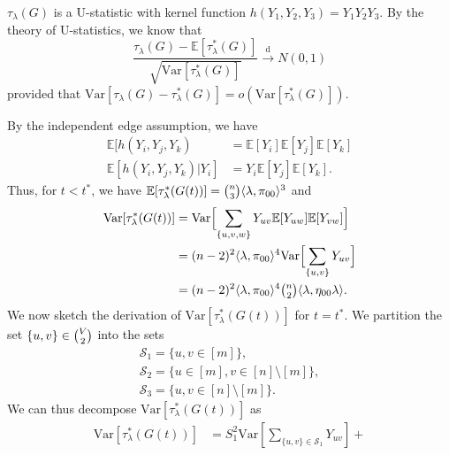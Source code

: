 \documentclass[10pt,journal,compsoc]{IEEEtran}
\theoremstyle{definition}
\begin{document}
\begin{IEEEproof}[Lemma~3]
  $\tau_{\lambda}(G)$ is a U-statistic with kernel function
  $h(Y_1, Y_2, Y_3) = Y_1 Y_2 Y_3$. By the theory of U-statistics, we
  know that
  \begin{equation}
    \label{eq:48}
    \frac{\tau_{\lambda}(G) -
      \mathbb{E}[\tau_{\lambda}^{*}(G)]}{\sqrt{\mathrm{Var}[\tau_{\lambda}^{*}(G)]}}
       \overset{\mathrm{d}}{\longrightarrow}  N(0,1)
  \end{equation}
  provided that $\mathrm{Var}[\tau_{\lambda}(G) -
  \tau_{\lambda}^{*}(G)] = o(\mathrm{Var}[\tau_{\lambda}^{*}(G)])$.
  
  By the independent edge assumption, we have
  \begin{align}
    \mathbb{E}[h(Y_i, Y_j, Y_k) &= \mathbb{E}[Y_i]
  \mathbb{E}[Y_j] \mathbb{E}[Y_k] \\ 
  \mathbb{E}[h(Y_i, Y_j, Y_k) |
  Y_i] &= Y_i \mathbb{E}[Y_j] \mathbb{E}[Y_k].
  \end{align}
 Thus, for $t < t^{*}$, we have $\mathbb{E}[\tau_{\lambda}^{*}(G(t))] = \tbinom{n}{3} \langle
  \lambda, \pi_{00} \rangle^{3}$ and
  \begin{equation}
    \begin{split}
      \mathrm{Var}[\tau_{\lambda}^{*}(G(t))] &=
      \mathrm{Var}\Bigl[\sum_{\{u,v,w\}} Y_{uv} \mathbb{E}[Y_{uw}]
      \mathbb{E}[Y_{vw}]\Bigr] \\
      &= (n-2)^{2} \langle \lambda, \pi_{00} \rangle^{4}
      \mathrm{Var}\Bigl[\sum_{\{u,v\}} Y_{uv} \Bigr] \\
      &= (n-2)^{2} \langle \lambda, \pi_{00} \rangle^{4} \tbinom{n}{2}
      \langle \lambda, \eta_{00} \lambda \rangle.
    \end{split}
  \end{equation}
  We now sketch the derivation of
  $\mathrm{Var}[\tau_{\lambda}^{*}(G(t))]$ for $t = t^{*}$. We partition the set
  $\{u,v\} \in \tbinom{V}{2}$ into the sets 
\begin{gather*}
\mathcal{S}_1 = \{ u,v \in [m]
  \}, \\ \mathcal{S}_2 = \{ u \in [m], v \in [n] \setminus [m]\}, \\
  \mathcal{S}_3 = \{ u, v \in [n] \setminus[m]\}.
\end{gather*} 
We can thus decompose $\mathrm{Var}[\tau_{\lambda}^{*}(G(t))]$ as 
\begin{equation}
  \begin{split}
  \mathrm{Var}[\tau_{\lambda}^{*}(G(t))] &= S_1^{2} \mathrm{Var}[\sum_{\{u,v\} \in \mathcal{S}_1} Y_{uv}] +

\end{split}
\end{equation}
\end{IEEEproof}
\end{document}
